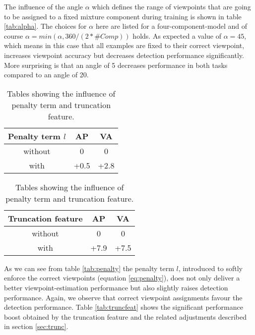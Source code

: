 The influence of the angle $\alpha$ which defines the range of viewpoints that are going to be assigned to a fixed mixture component during training is shown in table \ref{tab:alpha}. The choices for $\alpha$ here are listed for a four-component-model and of course $\alpha=min(\alpha,360/(2*\#Comp))$ holds. As expected a value of $\alpha=45$, which means in this case that all examples are fixed to their correct viewpoint, increases viewpoint accuracy but decreases detection performance significantly. More surprising is that an angle of 5 decreases performance in both tasks compared to an angle of 20. 

\begin{table}[]
	\parbox{.45\linewidth}{
		\centering
		\begin{tabular}{|c|c|c|}
		\hline
		Penalty term $l$ & AP & VA\\
		\hline\hline
		 without & 0 & 0\\
		\hline 
		 with & +0.5 & +2.8 \\
		 \hline 
		\end{tabular}
		\label{tab:penalty}
	}	
	\parbox{.45\linewidth}{
		\centering
		\begin{tabular}{|c|c|c|}
		\hline
		Truncation feature & AP & VA\\
		\hline\hline
		 without & 0 & 0\\
		\hline 
		 with & +7.9 & +7.5 \\
		 \hline 
		\end{tabular}
		\label{tab:truncfeat}
	}		
	\caption{Tables showing the influence of penalty term and truncation feature.}
	\label{tab:otherParam}
\end{table}

As we can see from table \ref{tab:penalty} the penalty term $l$, introduced to softly enforce the correct viewpoints (equation \ref{eq:penalty}), does not only deliver a better viewpoint-estimation performance but also slightly raises detection performance. Again, we observe that correct viewpoint assignments favour the detection performance. Table \ref{tab:truncfeat} shows the significant performance boost obtained by the truncation feature and the related adjustments described in section \ref{sec:trunc}.

